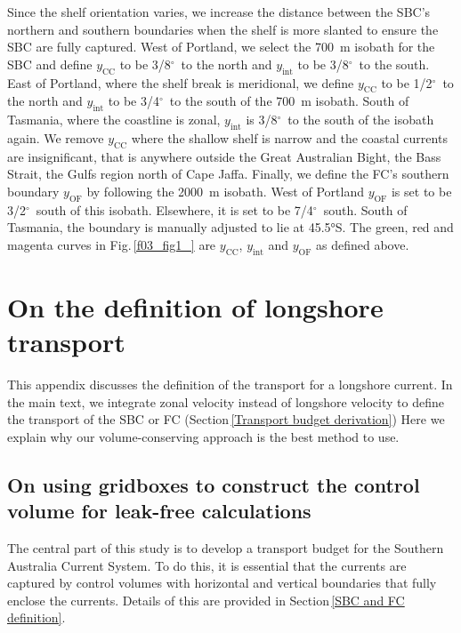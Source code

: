 \documentclass[preprint,3p,review,12pt]{elsarticle}
\newcommand{\SIadj}[2]{\SI[number-unit-product={\text{-}}]{#1}{#2}}
\newcommand{\dg}{$^{\circ}$}
\newcommand{\sub}[1]{_{\text{#1}}}
\begin{document}
Since the shelf orientation varies, we increase the distance between the SBC's northern and southern boundaries when the shelf is more slanted to ensure the SBC are fully captured. West of Portland, we select the \SIadj{700}{\meter} isobath for the SBC and define $y\sub{CC}$ to be 3/8\dg~to the north and $y\sub{int}$ to be 3/8\dg~to the south. East of Portland, where the shelf break is meridional, we define $y\sub{CC}$ to be 1/2\dg~to the north and $y\sub{int}$ to be 3/4\dg~to the south of the \SIadj{700}{\meter} isobath. South of Tasmania, where the coastline is zonal, $y\sub{int}$ is 3/8\dg~to the south of the isobath again.
We remove $y\sub{CC}$ where the shallow shelf is narrow and the coastal currents are insignificant, that is anywhere outside the Great Australian Bight, the Bass Strait, the Gulfs region north of Cape Jaffa. Finally, we define the FC's southern boundary $y\sub{OF}$ by following the \SIadj{2000}{\meter} isobath. West of Portland $y\sub{OF}$ is set to be 3/2\dg~south of this isobath. Elsewhere, it is set to be 7/4\dg~south. South of Tasmania, the boundary is manually adjusted to lie at \ang{45.5}S.
The green, red and magenta curves in Fig.\,\ref{f03_fig1_} are $y\sub{CC}$, $y\sub{int}$ and $y\sub{OF}$ as defined above.

\section{On the definition of longshore transport} \label{Reasoning for defining the SBC transport and the FC transport from their zonal transport}
This appendix discusses the definition of the transport for a longshore current. In the main text, we integrate zonal velocity instead of longshore velocity to define the transport of the SBC or FC (Section\,\ref{Transport budget derivation}) Here we explain why our volume-conserving approach is the best method to use.

\subsection{On using gridboxes to construct the control volume for leak-free calculations} \label{leak-free}
The central part of this study is to develop a transport budget for the Southern Australia Current System. To do this, it is essential that the currents are captured by control volumes with horizontal and vertical boundaries that fully enclose the currents. Details of this are provided in Section\,\ref{SBC and FC definition}.
\end{document}
